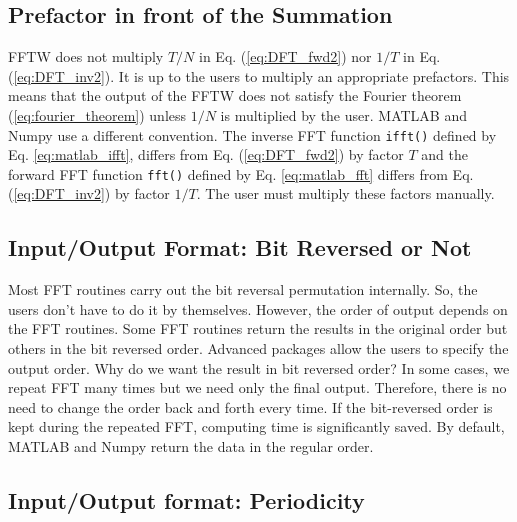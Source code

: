 \subsection{Prefactor in front of the Summation}

FFTW does not multiply $T/N$ in  Eq. (\ref{eq:DFT_fwd2})  nor $1/T$ in Eq. (\ref{eq:DFT_inv2}).  It is up to the users to multiply an appropriate prefactors.  This means that the output of the FFTW does not satisfy the Fourier theorem (\ref{eq:fourier_theorem}) unless $1/N$ is multiplied by the user.  MATLAB and Numpy use a different convention.  The inverse FFT function \texttt{ifft()} defined by Eq. \eqref{eq:matlab_ifft}, differs  from Eq. (\ref{eq:DFT_fwd2}) by factor $T$ and the forward FFT function \texttt{fft()} defined by Eq. \eqref{eq:matlab_fft} differs from Eq. (\ref{eq:DFT_inv2}) by factor $1/T$.  The user must multiply these factors manually. 

\subsection{Input/Output Format: Bit Reversed or Not}

Most FFT routines carry out the bit reversal permutation internally. So, the users don't have to do it by themselves.  However, the order of output depends on the FFT routines. Some FFT routines return the results in the original order but others in the bit reversed order. Advanced packages allow the users to specify the output order.  Why do we want the result in bit reversed order? In some cases, we repeat FFT many times but we need only the final output.  Therefore, there is no need to change the order back and forth every time.  If the bit-reversed order is kept during the repeated FFT, computing time is significantly saved. By default, MATLAB and Numpy return the data in the regular order.

\subsection{Input/Output format: Periodicity}

